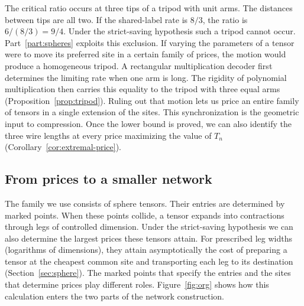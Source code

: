 The critical ratio occurs at three tips of a tripod with unit arms.
The distances between tips are all two. If the shared-label rate is
\(8/3\), the ratio is \(6/(8/3)=9/4\). Under the strict-saving
hypothesis such a tripod cannot occur. Part~\ref{part:spheres} exploits
this exclusion. If varying the parameters of a tensor were to move
its preferred site in a certain family of prices, the motion would
produce a homogeneous tripod. A rectangular multiplication decoder
first determines the limiting rate when one arm is long. The rigidity
of polynomial multiplication then carries this equality to the tripod
with three equal arms (Proposition~\ref{prop:tripod}). Ruling out that
motion lets us price an entire family of tensors in a single extension
of the sites. This synchronization is the geometric input to compression. Once
the lower bound is proved, we can also identify the three wire lengths
at every price maximizing the value of \(T_n\)
(Corollary~\ref{cor:extremal-price}).

\subsection{From prices to a smaller network}

The family we use consists of sphere tensors. Their entries are
determined by marked points. When these points collide, a tensor
expands into contractions through legs of controlled dimension. Under
the strict-saving hypothesis we can also determine the largest prices
these tensors attain. For prescribed leg widths (logarithms of
dimensions), they attain asymptotically the cost of preparing a
tensor at the cheapest common site and transporting each leg to its
destination (Section~\ref{sec:sphere}). The marked points that specify
the entries and the sites that determine prices play different roles.
Figure~\ref{fig:org} shows how this calculation enters the two parts of
the network construction.

